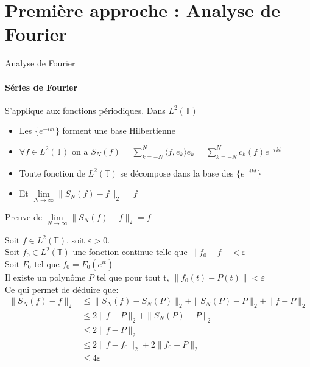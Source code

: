 \documentclass[french]{beamer}
\begin{document}
\section{Première approche : Analyse de Fourier}
\begin{frame}{Analyse de Fourier}
	\framesubtitle{Séries de Fourier}
	
	S'applique aux fonctions périodiques. 
	Dans $L^2(\mathbb{T})$
	\begin{itemize}
		\item<1-> Les $\{e^{-ikt}\}$ forment une base Hilbertienne
		\item<2-> $ \forall f \in L^2(\mathbb{T})$ on a $ S_N(f)= \sum_{k = -N}^N \langle f, e_k \rangle e_k = 
		\sum_{k = -N}^N c_k(f) e^{-ikt}  $ 
		\item<3-> Toute fonction de $L^2(\mathbb{T})$ se décompose dans la base des $\{e^{-ikt}\}$
		\item<4-> Et $ \lim\limits_{N \to \infty} \| S_N(f) - f \|_2  = f $ 
		
	\end{itemize}
	
\end{frame}

\begin{frame}{Preuve de $ \lim\limits_{N \to \infty} \| S_N(f) - f \|_2  = f $ }
	
	Soit $f \in L^2(\mathbb{T})$, soit $\varepsilon > 0$.\\
	Soit $f_0 \in L^2(\mathbb{T})$ une fonction continue telle que 
	$ \| f_0 - f \| < \varepsilon $\\
	\pause
	Soit $F_0$ tel que $f_0 = F_0(e^{it})$\\ 
	Il existe un polynôme $P$ tel que pour tout t, $\|f_0(t) - P(t)\| < \varepsilon$\\
	Ce qui permet de déduire que: \\
	\pause
	\begin{align*}
	\| S_N(f) -f \|_2 &\leqslant \|S_N(f) - S_N(P)\|_2 + \| S_N(P) - P \|_2 + \| f- P \|_2 \\
	&	\leqslant 2 \| f - P\|_2 + \| S_N(P) - P\|_2 \ \\
	& \leqslant 2 \| f - P\|_2  \\
	& \leqslant 2 \| f - f_0\|_2 + 2 \| f_0- P\|_2 \\
	& \leqslant 4 \varepsilon
	\end{align*}
	
	
\end{frame}
\end{document}
